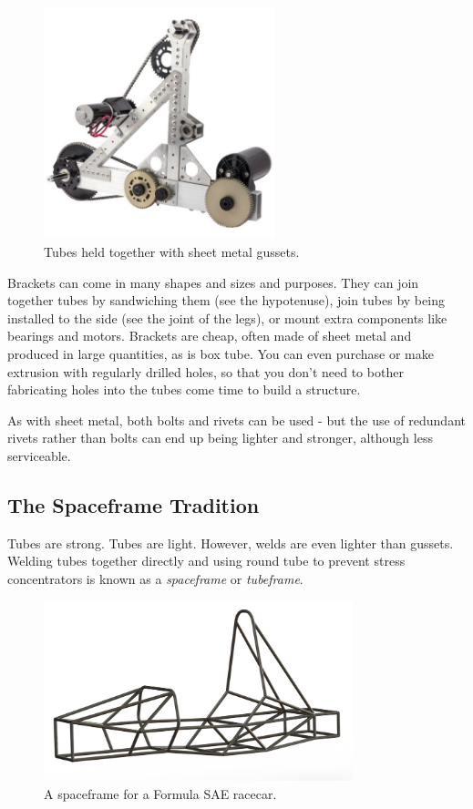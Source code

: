 \documentclass[10pt,letterpaper]{book}
\begin{document}
	\begin{figure}[H]
		\includegraphics[width=0.6\textwidth]{imgs/tradition_gussetbox.jpeg}
		\caption{Tubes held together with sheet metal gussets.}
	\end{figure}
	
	Brackets can come in many shapes and sizes and purposes. They can join together tubes by sandwiching them (see the hypotenuse), join tubes by being installed to the side (see the joint of the legs), or mount extra components like bearings and motors. Brackets are cheap, often made of sheet metal and produced in large quantities, as is box tube. You can even purchase or make extrusion with regularly drilled holes, so that you don't need to bother fabricating holes into the tubes come time to build a structure.
	
	As with sheet metal, both bolts and rivets can be used - but the use of redundant rivets rather than bolts can end up being lighter and stronger, although less serviceable.
	
	\subsection{The Spaceframe Tradition}
	Tubes are strong. Tubes are light. However, welds are even lighter than gussets. Welding tubes together directly and using round tube to prevent stress concentrators is known as a \textit{spaceframe} or \textit{tubeframe}.
	
	
	\begin{figure}[H]
		\includegraphics[width=0.8\textwidth]{imgs/tradition_tubeframe.jpeg}
		\caption{A spaceframe for a Formula SAE racecar.}
	\end{figure}
	
\end{document}
